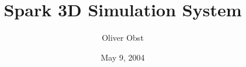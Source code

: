 \documentclass[a4paper,11pt]{scrbook}
\begin{document}
\subject{Users Guide}
\title{Spark 3D Simulation System}
\author{Oliver Obst}

\date{May 9, 2004}

\lowertitleback{Copyright {\textcopyright} 2004 Universit{\"a}t Koblenz. Permission is
  granted to copy, distribute and/or modify this document under the
  terms of the GNU Free Documentation License, Version 1.1, published by the 
  Free Software Foundation; 
  with no Invariant Sections, with no Front-Cover Texts, and with no
  Back-Cover Texts. A copy of the license is included in the section
  entitled ``GNU Free Documentation License''. }

\maketitle%
\thispagestyle{empty}

\tableofcontents
\end{document}
